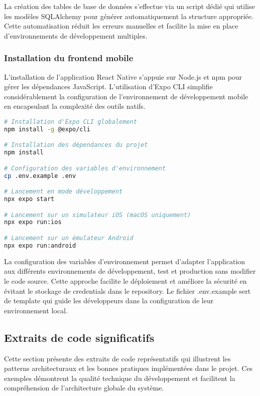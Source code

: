 La création des tables de base de données s'effectue via un script dédié qui utilise les modèles SQLAlchemy pour générer automatiquement la structure appropriée. Cette automatisation réduit les erreurs manuelles et facilite la mise en place d'environnements de développement multiples.

\subsubsection{Installation du frontend mobile}

L'installation de l'application React Native s'appuie sur Node.js et npm pour gérer les dépendances JavaScript. L'utilisation d'Expo CLI simplifie considérablement la configuration de l'environnement de développement mobile en encapsulant la complexité des outils natifs.

\begin{lstlisting}[language=bash, caption=Installation du frontend React Native]
# Installation d'Expo CLI globalement
npm install -g @expo/cli

# Installation des dépendances du projet
npm install

# Configuration des variables d'environnement
cp .env.example .env

# Lancement en mode développement
npx expo start

# Lancement sur un simulateur iOS (macOS uniquement)
npx expo run:ios

# Lancement sur un émulateur Android
npx expo run:android
\end{lstlisting}

La configuration des variables d'environnement permet d'adapter l'application aux différents environnements de développement, test et production sans modifier le code source. Cette approche facilite le déploiement et améliore la sécurité en évitant le stockage de credentials dans le repository. Le fichier .env.example sert de template qui guide les développeurs dans la configuration de leur environnement local.

\subsection{Extraits de code significatifs}

Cette section présente des extraits de code représentatifs qui illustrent les patterns architecturaux et les bonnes pratiques implémentées dans le projet. Ces exemples démontrent la qualité technique du développement et facilitent la compréhension de l'architecture globale du système.

